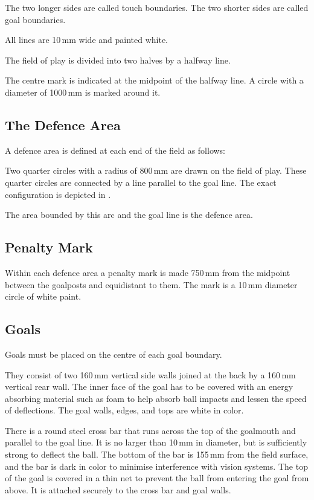 The two longer sides are called touch boundaries.
The two shorter sides are called goal boundaries.

All lines are 10\,mm wide and painted white.

The field of play is divided into two halves by a halfway line.

The centre mark is indicated at the midpoint of the halfway line.
A circle with a diameter of 1000\,mm is marked around it.

\subsection{The Defence Area}
A defence area is defined at each end of the field as follows:

Two quarter circles with a radius of 800\,mm are drawn on the field of play.
These quarter circles are connected by a line parallel to the goal line.
The exact configuration is depicted in .

The area bounded by this arc and the goal line is the defence area.

\subsection{Penalty Mark}
Within each defence area a penalty mark is made 750\,mm from the midpoint between the goalposts and equidistant to them.
The mark is a 10\,mm diameter circle of white paint.

\subsection{Goals}
Goals must be placed on the centre of each goal boundary.

They consist of two 160\,mm vertical side walls joined at the back by a 160\,mm vertical rear wall.
The inner face of the goal has to be covered with an energy absorbing material such as foam to help absorb ball impacts and lessen the speed of deflections.
The goal walls, edges, and tops are white in color.

There is a round steel cross bar that runs across the top of the goalmouth and parallel to the goal line.
It is no larger than 10\,mm in diameter, but is sufficiently strong to deflect the ball.
The bottom of the bar is 155\,mm from the field surface, and the bar is dark in color to minimise interference with vision systems.
The top of the goal is covered in a thin net to prevent the ball from entering the goal from above.
It is attached securely to the cross bar and goal walls.

